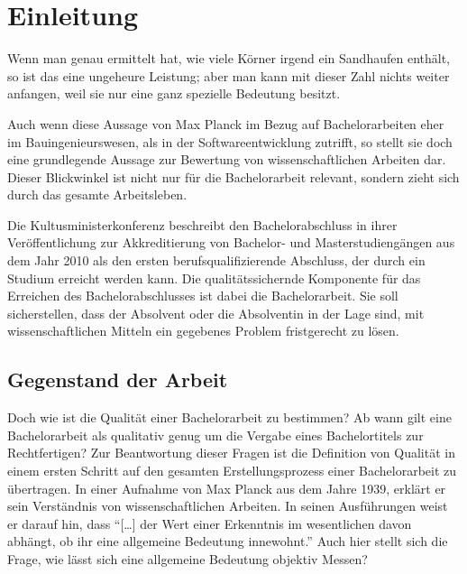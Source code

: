 
\chapter{Einleitung}
\begin{displayquote}
    Wenn man genau ermittelt hat, wie viele Körner irgend ein Sandhaufen enthält, so ist das eine ungeheure Leistung; aber man kann mit dieser Zahl nichts weiter anfangen, weil sie nur eine ganz spezielle Bedeutung besitzt.
\end{displayquote}

Auch wenn diese Aussage von Max Planck im Bezug auf Bachelorarbeiten eher im Bauingenieurswesen, als in der Softwareentwicklung zutrifft, so stellt sie doch eine grundlegende Aussage zur Bewertung von wissenschaftlichen Arbeiten dar. Dieser Blickwinkel ist nicht nur für die Bachelorarbeit relevant, sondern zieht sich durch das gesamte Arbeitsleben. 

Die Kultusministerkonferenz beschreibt den Bachelorabschluss in ihrer Veröffentlichung zur Akkreditierung von Bachelor- und Masterstudiengängen aus dem Jahr 2010 als den ersten berufsqualifizierende Abschluss, der durch ein Studium erreicht werden kann. Die qualitätssichernde Komponente für das Erreichen des Bachelorabschlusses ist dabei die Bachelorarbeit. Sie soll sicherstellen, dass der Absolvent oder die Absolventin in der Lage sind, mit wissenschaftlichen Mitteln ein gegebenes Problem fristgerecht zu lösen.\cite[Vgl.][S.4]{kmk:2010}



\section{Gegenstand der Arbeit}
Doch wie ist die Qualität einer Bachelorarbeit zu bestimmen? Ab wann gilt eine Bachelorarbeit als qualitativ genug um die Vergabe eines Bachelortitels zur Rechtfertigen? Zur Beantwortung dieser Fragen ist die Definition von Qualität in einem ersten Schritt auf den gesamten Erstellungsprozess einer Bachelorarbeit zu übertragen. 
In einer Aufnahme von Max Planck aus dem Jahre 1939, erklärt er sein Verständnis von wissenschaftlichen Arbeiten. In seinen Ausführungen weist er darauf hin, dass \enquote{[…] der Wert einer Erkenntnis im wesentlichen davon abhängt, ob ihr eine allgemeine Bedeutung innewohnt.}\cite{Herneck:1976}
Auch hier stellt sich die Frage, wie lässt sich eine allgemeine Bedeutung objektiv Messen? 


